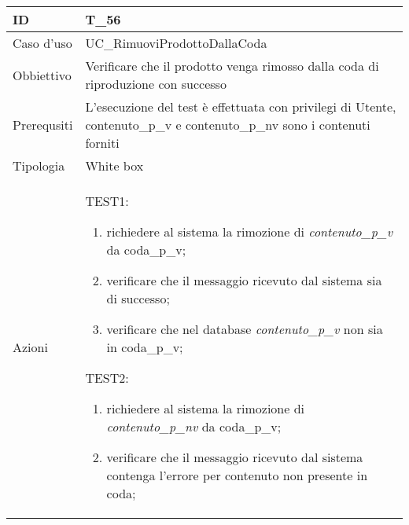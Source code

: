 \begin{table}[hb]
    \centering
    \begin{tabular}{ |p{2cm}|p{10cm}|  }
        \hline
        ID          & T\_56                                                                 \\\hline
        Caso d'uso  & UC\_RimuoviProdottoDallaCoda                                                    \\\hline
        Obbiettivo  & Verificare che il prodotto venga rimosso dalla coda di riproduzione con successo \\\hline
        Prerequsiti & L'esecuzione del test è effettuata con privilegi di Utente, contenuto\_p\_v
        e contenuto\_p\_nv sono i contenuti forniti           \\\hline
        Tipologia   & White box                                                             \\\hline
        Azioni      &
        TEST1:
        \begin{enumerate}[nosep, topsep=0pt]
            \item richiedere al sistema la rimozione di \emph{contenuto\_p\_v} da coda\_p\_v;
            \item verificare che il messaggio ricevuto dal sistema sia di successo;
            \item verificare che nel database \emph{contenuto\_p\_v} non sia in coda\_p\_v;
        \end{enumerate}
        \vspace{0.5cm} TEST2:
        \begin{enumerate}[nosep, topsep=0pt]
            \item richiedere al sistema la rimozione di \emph{contenuto\_p\_nv} da coda\_p\_v;
            \item verificare che il messaggio ricevuto dal sistema contenga l'errore per
            contenuto non presente in coda;
        \end{enumerate}
        \\\hline
    \end{tabular}
\end{table}

